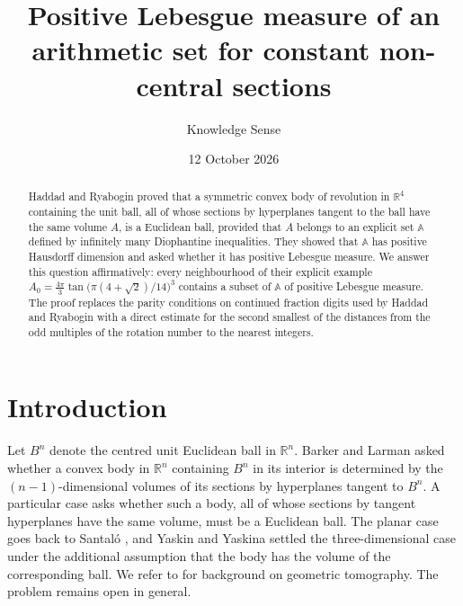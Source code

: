 \documentclass{amsart}
\theoremstyle{definition}
\theoremstyle{remark}
\numberwithin{equation}{section}
\newcommand{\R}{\mathbb{R}}
\newcommand{\AAA}{\mathbb{A}}
\begin{document}
\title[Positive measure for constant non-central sections]{Positive Lebesgue measure of an arithmetic set for constant non-central sections}

\author{Knowledge Sense}

\date{12 October 2026}



\begin{abstract}
Haddad and Ryabogin proved that a symmetric convex body of revolution in $\R^4$ containing the unit ball, all of whose sections by hyperplanes tangent to the ball have the same volume $A$, is a Euclidean ball, provided that $A$ belongs to an explicit set $\AAA$ defined by infinitely many Diophantine inequalities. They showed that $\AAA$ has positive Hausdorff dimension and asked whether it has positive Lebesgue measure. We answer this question affirmatively: every neighbourhood of their explicit example $A_0=\frac{4\pi}{3}\tan\bigl(\pi(4+\sqrt2)/14\bigr)^3$ contains a subset of $\AAA$ of positive Lebesgue measure. The proof replaces the parity conditions on continued fraction digits used by Haddad and Ryabogin with a direct estimate for the second smallest of the distances from the odd multiples of the rotation number to the nearest integers.
\end{abstract}

\maketitle

\section{Introduction}

Let $B^n$ denote the centred unit Euclidean ball in $\R^n$. Barker and Larman \cite{BL} asked whether a convex body in $\R^n$ containing $B^n$ in its interior is determined by the $(n-1)$-dimensional volumes of its sections by hyperplanes tangent to $B^n$. A particular case asks whether such a body, all of whose sections by tangent hyperplanes have the same volume, must be a Euclidean ball. The planar case goes back to Santal\'o \cite{Sa}, and Yaskin and Yaskina \cite{YY} settled the three-dimensional case under the additional assumption that the body has the volume of the corresponding ball. We refer to \cite{Ga} for background on geometric tomography. The problem remains open in general.
\end{document}
